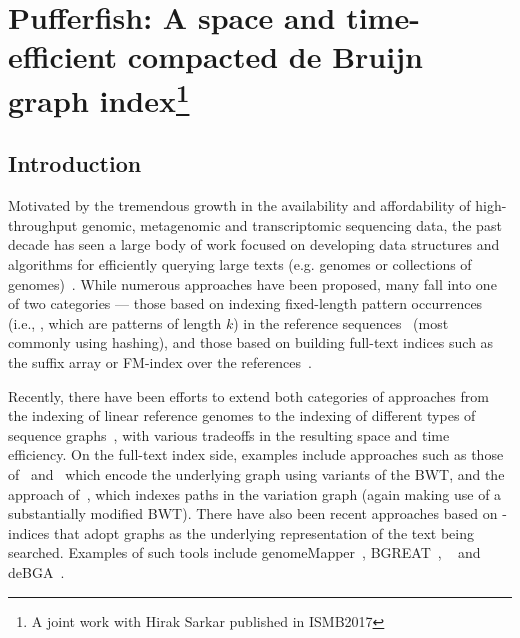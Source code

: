 \chapter{Pufferfish: A space and time-efficient compacted de Bruijn graph index\protect\footnote{A joint work with Hirak Sarkar published in ISMB2017}}
\label{chap:pufferfish}


\section{Introduction}\label{sec:puffintro}

Motivated by the tremendous growth in the availability and affordability of
high-throughput genomic, metagenomic and transcriptomic sequencing data, the
past decade has seen a large body of work focused on developing data structures
and algorithms for efficiently querying large texts (e.g. genomes or collections
of
genomes)~\citep{li2008mapping,langmead2009ultrafast,li2009fast,hach2010mrsfast,langmead2012fast,li2013aligning,liao2013subread,dobin2013star,kim2015hisat}.
While numerous approaches have been proposed, many fall into one of two
categories --- those based on indexing fixed-length pattern occurrences (i.e.,
\kmers, which are patterns of length $k$) in the reference
sequences~\citep{li2008mapping,hach2010mrsfast,liao2013subread} (most commonly using hashing), and those based on building full-text indices such
as the suffix array or FM-index over the
references~\citep{langmead2009ultrafast,li2009fast,langmead2012fast,li2013aligning,dobin2013star,kim2015hisat}.

Recently, there have been efforts to extend both categories of approaches from
the indexing of linear reference genomes to the indexing of different types of
sequence graphs~\citep{paten2017genome}, with various tradeoffs in the resulting
space and time efficiency. On the full-text index side, examples include
approaches such as those of~\citet{maciuca2016natural} and~\citet{Beller2016} which
encode the underlying graph using variants of the BWT, and the approach
of~\citet{Sirn2017}, which indexes paths in the variation graph (again making
use of a substantially modified BWT). There have also been recent approaches based on
\kmer-indices that adopt graphs as the underlying representation of the
text being searched. Examples of such tools include genomeMapper~\citep{schneeberger2009simultaneous}, BGREAT~\citep{limasset2016read},
\kallisto~\citep{Bray2016Kallisto} and deBGA~\citep{liu2016debga}.

